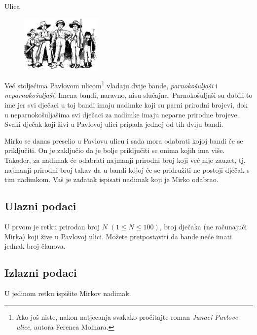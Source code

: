 \begin{statement}[
  problempoints=30,
  timelimit=1 sekunda,
  memorylimit=512 MiB,
]{Ulica}

\setlength\intextsep{-0.1cm}
\begin{figure}
\centering
\includegraphics[width=0.35\textwidth]{img/ulica.png}
\end{figure}

Već stoljećima Pavlovom ulicom\footnote{Ako još niste, nakon natjecanja svakako
pročitajte roman \textit{Junaci Pavlove ulice}, autora Ferenca Molnara.}
vladaju dvije bande, \textit{parnokošuljaši} i \textit{neparnokošuljaši}.
Imena bandi, naravno, nisu slučajna. Parnokošuljaši su dobili to ime jer svi
dječaci u toj bandi imaju nadimke koji su parni prirodni brojevi, dok u
neparnokošuljašima svi dječaci za nadimke imaju neparne prirodne brojeve.
Svaki dječak koji živi u Pavlovoj ulici pripada jednoj od tih dviju bandi.

Mirko se danas preselio u Pavlovu ulicu i sada mora odabrati kojoj bandi će se
priključiti. On je zaključio da je bolje priključiti se onima kojih ima više.
Također, za nadimak će odabrati najmanji prirodni broj koji već nije zauzet,
tj. najmanji prirodni broj takav da u bandi kojoj će se pridružiti ne postoji
dječak s tim nadimkom. Vaš je zadatak ispisati nadimak koji je Mirko odabrao.


\subsection*{Ulazni podaci}
U prvom je retku prirodan broj $N$ $(1 \le N \le 100)$, broj dječaka (ne
računajući Mirka) koji žive u Pavlovoj ulici. Možete pretpostaviti da bande
neće imati jednak broj članova.

\subsection*{Izlazni podaci}
U jedinom retku ispišite Mirkov nadimak.


\end{statement}
